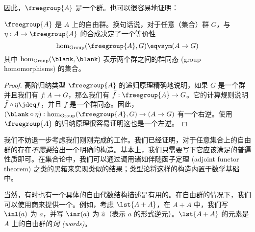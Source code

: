 因此，$\freegroup{A}$ 是一个群。也可以很容易地证明：

\begin{thm}
  $\freegroup{A}$ 是 $A$ 上的自由群。换句话说，对于任意（集合）群 $G$，与 $\eta:A\to \freegroup{A}$ 的合成决定了一个等价性
  \[ \hom_{\mathrm{Group}}(\freegroup{A},G) \eqvsym (A\to G) \]
  其中 $\hom_{\mathrm{Group}}(\blank,\blank)$ 表示两个群之间的群同态 (group homomorphisms) 的集合。
\end{thm}
\begin{proof}
  高阶归纳类型 $\freegroup{A}$ 的递归原理精确地说明，如果 $G$ 是一个群并且我们有 $f:A\to G$，那么我们有 $\bar{f}:\freegroup{A} \to G$。它的计算规则说明 $\bar{f}\circ \eta \jdeq f$，并且 $\bar f$ 是一个群同态。因此，$(\blank\circ \eta) :  \hom_{\mathrm{Group}}(\freegroup{A},G) \to (A\to G)$ 有一个右逆。使用 $\freegroup{A}$ 的归纳原理很容易证明这也是一个左逆。
\end{proof}

我们不妨退一步考虑我们刚刚完成的工作。我们已经证明，对于任意集合上的自由群的存在\emph{不需要}给出一个明确的构造。基本上，我们只需要写下它应该满足的普遍性质即可。在集合论中，我们可以通过调用诸如伴随函子定理 (adjoint functor theorem) 之类的黑箱来实现类似的结果；类型论将这样的构造内置于数学基础中。

当然，有时也有一个具体的自由代数结构描述是有用的。在自由群的情况下，我们可以使用商来提供一个。例如，考虑 $\lst{A+A}$，在 $A+A$ 中，我们写 $\inl(a)$ 为 $a$，并写 $\inr(a)$ 为 $\hat{a}$（表示 $a$ 的形式逆元）。$\lst{A+A}$ 的元素是 $A$ 上的自由群的\emph{词 (words)}。


